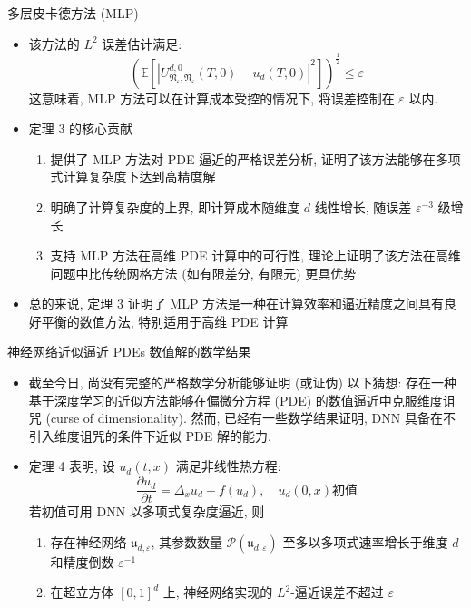 \documentclass[aspectratio=169]{beamer}
\begin{document}
		\begin{frame}{多层皮卡德方法 (MLP)}
			\begin{itemize}
			\item 该方法的 $L^2$ 误差估计满足:
				\begin{equation*}
					\left(\mathbb{E}\left[\left\lvert U^{d,0}_{\mathfrak{N}_{\varepsilon}, \mathfrak{N}_\varepsilon}\left(T, 0\right) - u_{d}\left(T, 0\right)\right\rvert^2\right]\right)^{\frac{1}{2}} \leq \varepsilon
				\end{equation*}
				这意味着, MLP 方法可以在计算成本受控的情况下, 将误差控制在 $\varepsilon$ 以内.
			\item 定理 3 的核心贡献
				\begin{enumerate}
					\item 提供了 MLP 方法对 PDE 逼近的严格误差分析, 证明了该方法能够在多项式计算复杂度下达到高精度解
					\item 明确了计算复杂度的上界, 即计算成本随维度 $d$ 线性增长, 随误差 $\varepsilon^{-3}$ 级增长
					\item 支持 MLP 方法在高维 PDE 计算中的可行性, 理论上证明了该方法在高维问题中比传统网格方法 (如有限差分, 有限元) 更具优势
				\end{enumerate}
			\item 总的来说, 定理 3 证明了 MLP 方法是一种在计算效率和逼近精度之间具有良好平衡的数值方法, 特别适用于高维 PDE 计算
		\end{itemize}
	\end{frame}

	\begin{frame}{神经网络近似逼近 PDEs 数值解的数学结果}
		\begin{itemize}
			\item 截至今日, 尚没有完整的严格数学分析能够证明 (或证伪) 以下猜想: 存在一种基于深度学习的近似方法能够在偏微分方程 (PDE) 的数值逼近中克服维度诅咒 (curse of dimensionality). 然而, 已经有一些数学结果证明, DNN 具备在不引入维度诅咒的条件下近似 PDE 解的能力.
			\item 定理 4 表明, 设 $u_{d}\left(t, x\right)$ 满足非线性热方程:
				\begin{equation*}
					\frac{\partial u_d}{\partial t} = \Delta_x u_d + f(u_d), \quad u_d(0,x)\text{初值}
				\end{equation*}
    			若初值可用 DNN 以多项式复杂度逼近, 则
				\begin{enumerate}
					\item 存在神经网络 $\mathfrak{u}_{d,\varepsilon}$, 其参数数量 $\mathcal{P}\left(\mathfrak{u}_{d,\varepsilon}\right)$ 至多以多项式速率增长于维度 $d$ 和精度倒数 $\varepsilon^{-1}$
					\item 在超立方体 $[0,1]^d$ 上, 神经网络实现的 $L^{2}$-逼近误差不超过 $\varepsilon$
				\end{enumerate}
		\end{itemize}
	\end{frame}
\end{document}
